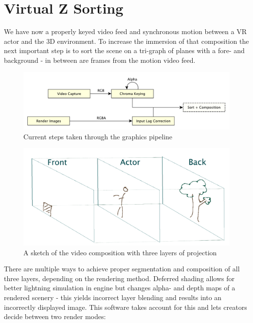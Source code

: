 %
\section{Virtual Z Sorting}

We have now a properly keyed video feed and synchronous motion between a VR 
actor and the 3D environment. To increase the immersion of that composition the 
next important step is to sort the scene on a tri-graph of planes with a fore- 
and background - in between are frames from the motion video feed.

\begin{figure}[htb]
	\includegraphics[width=\textwidth]{_raw_resources/pipeline_steps/4_5_composition.pdf}
	\caption{Current steps taken through the graphics pipeline}
	\label{fig:steps:composition}
\end{figure}

\begin{figure}[htb]
	\includegraphics[width=\textwidth]{_raw_resources/composition/Composition-TriGraph.png}
	\caption{A sketch of the video composition with three layers of projection}
	\label{fig:zsort:sketch}
\end{figure}

There are multiple ways to achieve proper segmentation and composition of all 
three layers, depending on the rendering method. Deferred shading allows for 
better lightning simulation in engine but changes alpha- and depth maps of a 
rendered scenery - this yields incorrect layer blending and results into an 
incorrectly displayed image. This software takes account for this and lets 
creators decide between two render modes:

